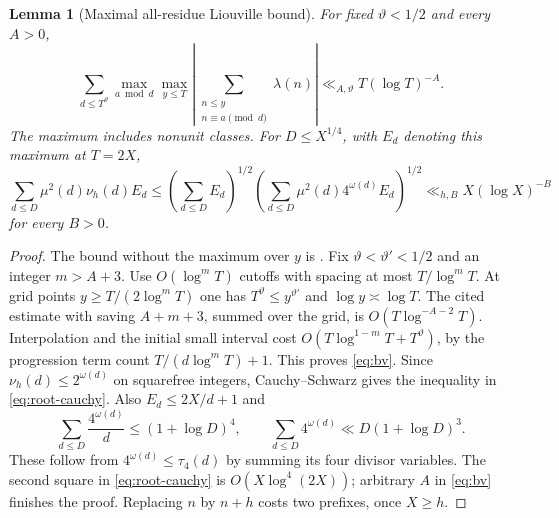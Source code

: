 \documentclass[11pt]{article}
\newtheorem{lemma}[theorem]{Lemma}
\theoremstyle{definition}
\theoremstyle{remark}
\numberwithin{equation}{section}
\begin{document}
\begin{lemma}[Maximal all-residue Liouville bound]\label{lem:bv}
For fixed $\vartheta<1/2$ and every $A>0$,
\begin{equation}\label{eq:bv}
 \sum_{d\le T^\vartheta}\max_{a\bmod d}\max_{y\le T}
 \left|\sum_{\substack{n\le y\\n\equiv a\pmod d}}\lambda(n)\right|
 \ll_{A,\vartheta} T(\log T)^{-A}.
\end{equation}
The maximum includes nonunit classes. For $D\le X^{1/4}$, with $E_d$ denoting this maximum at $T=2X$,
\begin{equation}\label{eq:root-cauchy}
 \sum_{d\le D}\mu^2(d)\nu_h(d)E_d
 \le\left(\sum_{d\le D}E_d\right)^{1/2}
     \left(\sum_{d\le D}\mu^2(d)4^{\omega(d)}E_d\right)^{1/2}
 \ll_{h,B}X(\log X)^{-B}
\end{equation}
for every $B>0$.
\end{lemma}
\begin{proof}
The bound without the maximum over $y$ is \cite[(1.5), p.~2]{PintzBV}.
Fix $\vartheta<\vartheta'<1/2$ and an integer $m>A+3$. Use $O(\log^m T)$ cutoffs with spacing at most
$T/\log^m T$. At grid points $y\ge T/(2\log^m T)$ one has $T^\vartheta\le y^{\vartheta'}$ and
$\log y\asymp\log T$. The cited estimate with saving $A+m+3$, summed over the grid, is
$O(T\log^{-A-2}T)$. Interpolation and the initial small interval cost
$O(T\log^{1-m}T+T^\vartheta)$, by the progression term count
$T/(d\log^m T)+1$. This proves \eqref{eq:bv}.
Since $\nu_h(d)\le2^{\omega(d)}$ on squarefree integers, Cauchy--Schwarz gives the inequality in
\eqref{eq:root-cauchy}. Also $E_d\le2X/d+1$ and
\begin{equation}\label{eq:divisor-bounds}
 \sum_{d\le D}\frac{4^{\omega(d)}}d\le(1+\log D)^4,\qquad
 \sum_{d\le D}4^{\omega(d)}\ll D(1+\log D)^3.
\end{equation}
These follow from $4^{\omega(d)}\le\tau_4(d)$ by summing its four divisor variables.
The second square in \eqref{eq:root-cauchy} is $O(X\log^4(2X))$; arbitrary $A$ in \eqref{eq:bv} finishes the proof.
Replacing $n$ by $n+h$ costs two prefixes, once $X\ge h$.
\end{proof}
\end{document}
